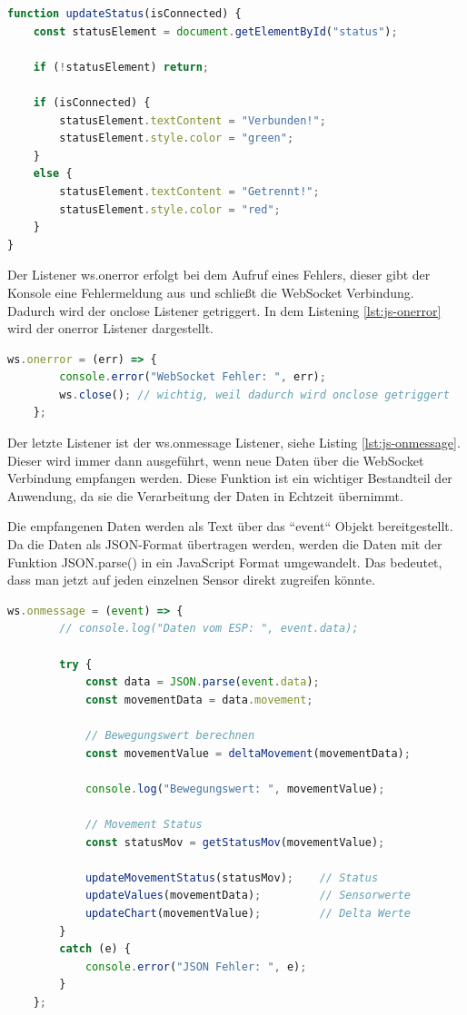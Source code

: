 \begin{lstlisting}[language=JavaScript, caption={Funktion updateStatus}, label={lst:js-updateStatus}, firstnumber=76]
function updateStatus(isConnected) {
    const statusElement = document.getElementById("status");

    if (!statusElement) return;

    if (isConnected) {
        statusElement.textContent = "Verbunden!";
        statusElement.style.color = "green";
    }
    else {
        statusElement.textContent = "Getrennt!";
        statusElement.style.color = "red";
    }
}
\end{lstlisting}

\noindent
Der Listener ws.onerror erfolgt bei dem Aufruf eines Fehlers, dieser gibt der Konsole eine Fehlermeldung aus und schließt die WebSocket Verbindung. Dadurch wird der onclose Listener getriggert. 
In dem Listening \ref{lst:js-onerror} wird der onerror Listener dargestellt.

\begin{lstlisting}[language=JavaScript, caption={WebSocket onerror}, label={lst:js-onerror}, firstnumber=70]
    ws.onerror = (err) => {
        console.error("WebSocket Fehler: ", err);
        ws.close(); // wichtig, weil dadurch wird onclose getriggert
    };
\end{lstlisting}

\noindent
Der letzte Listener ist der ws.onmessage Listener, siehe Listing \ref{lst:js-onmessage}. Dieser wird immer dann ausgeführt, wenn neue Daten über die WebSocket Verbindung empfangen werden. Diese Funktion ist ein wichtiger Bestandteil der Anwendung, da sie die Verarbeitung der Daten in Echtzeit übernimmt.

\noindent
Die empfangenen Daten werden als Text über das “event“ Objekt bereitgestellt. Da die Daten als JSON-Format übertragen werden, werden die Daten mit der Funktion JSON.parse() in ein JavaScript Format umgewandelt. Das bedeutet, dass man jetzt auf jeden einzelnen Sensor direkt zugreifen könnte.

\begin{lstlisting}[language=JavaScript, caption={WebSocket onmessage}, label={lst:js-onmessage}, firstnumber=26]
    ws.onmessage = (event) => {
        // console.log("Daten vom ESP: ", event.data);

        try {
            const data = JSON.parse(event.data); 
            const movementData = data.movement;

            // Bewegungswert berechnen
            const movementValue = deltaMovement(movementData);

            console.log("Bewegungswert: ", movementValue);

            // Movement Status
            const statusMov = getStatusMov(movementValue);

            updateMovementStatus(statusMov);    // Status
            updateValues(movementData);         // Sensorwerte
            updateChart(movementValue);         // Delta Werte
        }
        catch (e) {
            console.error("JSON Fehler: ", e);
        }
    };
\end{lstlisting}

